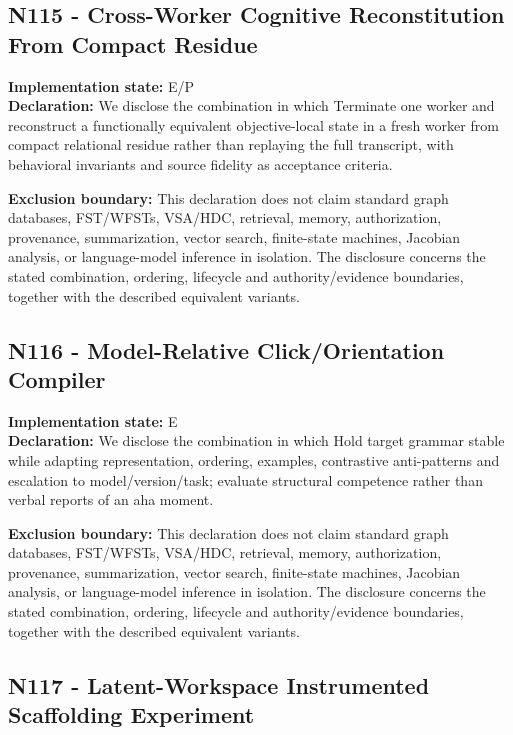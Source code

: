 \documentclass[
  10pt,
  letterpaper,
]{article}
\begin{document}
\subsection{N115 - Cross-Worker Cognitive Reconstitution From Compact
Residue}\label{n115---cross-worker-cognitive-reconstitution-from-compact-residue}

\textbf{Implementation state:} E/P\\
\textbf{Declaration:} We disclose the combination in which Terminate one
worker and reconstruct a functionally equivalent objective-local state
in a fresh worker from compact relational residue rather than replaying
the full transcript, with behavioral invariants and source fidelity as
acceptance criteria.

\textbf{Exclusion boundary:} This declaration does not claim standard
graph databases, FST/WFSTs, VSA/HDC, retrieval, memory, authorization,
provenance, summarization, vector search, finite-state machines,
Jacobian analysis, or language-model inference in isolation. The
disclosure concerns the stated combination, ordering, lifecycle and
authority/evidence boundaries, together with the described equivalent
variants.

\subsection{N116 - Model-Relative Click/Orientation
Compiler}\label{n116---model-relative-clickorientation-compiler}

\textbf{Implementation state:} E\\
\textbf{Declaration:} We disclose the combination in which Hold target
grammar stable while adapting representation, ordering, examples,
contrastive anti-patterns and escalation to model/version/task; evaluate
structural competence rather than verbal reports of an aha moment.

\textbf{Exclusion boundary:} This declaration does not claim standard
graph databases, FST/WFSTs, VSA/HDC, retrieval, memory, authorization,
provenance, summarization, vector search, finite-state machines,
Jacobian analysis, or language-model inference in isolation. The
disclosure concerns the stated combination, ordering, lifecycle and
authority/evidence boundaries, together with the described equivalent
variants.

\subsection{N117 - Latent-Workspace Instrumented Scaffolding
Experiment}\label{n117---latent-workspace-instrumented-scaffolding-experiment}
\end{document}
